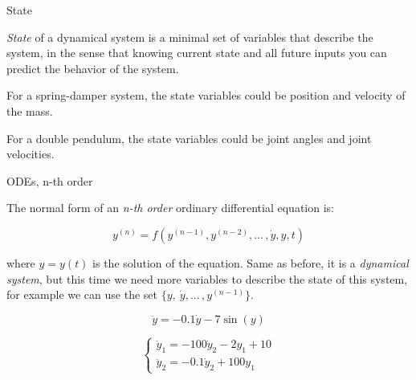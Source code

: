 \documentclass{beamer}
\begin{document}
\begin{frame}{State}
	\begin{flushleft}
		
		\emph{State} of a dynamical system is a minimal set of variables that describe the system, in the sense that knowing current state and all future inputs you can predict the behavior of the system.
		
		\begin{example}
			For a spring-damper system, the state variables could be position and velocity of the mass.
		\end{example} 
		\begin{example}
			For a double pendulum, the state variables could be joint angles and joint velocities.
		\end{example} 
		
	\end{flushleft}
\end{frame}






\begin{frame}{ODEs, n-th order}
\begin{flushleft}

The normal form of an \emph{n-th order} ordinary differential equation is:

\begin{equation}
	y^{(n)} = f (y^{(n-1)}, y^{(n-2)}, ...\,, \dot{y}, y, t)
\end{equation}
			
where $y = y(t)$ is the solution of the equation. Same as before, it is a \emph{dynamical system}, but this time we need more variables to describe the state of this system, for example we can use the set $\{ y, \ \dot{y} , ...\,,y^{(n-1)} \}$.

\begin{example}[Pendulum]
\begin{equation}
    \ddot{y} = - 0.1 \dot y - 7\sin(y)
\end{equation}
\end{example}


\begin{example}
\begin{equation}
\begin{cases}
    \dot{y}_1 = - 100 \dot{y}_2 -2 y_1  + 10 \\
    \ddot{y}_2 = -0.1 \dot{y}_2 + 100 y_1
\end{cases}
\end{equation}
\end{example}

\end{flushleft}
\end{frame}
\end{document}
